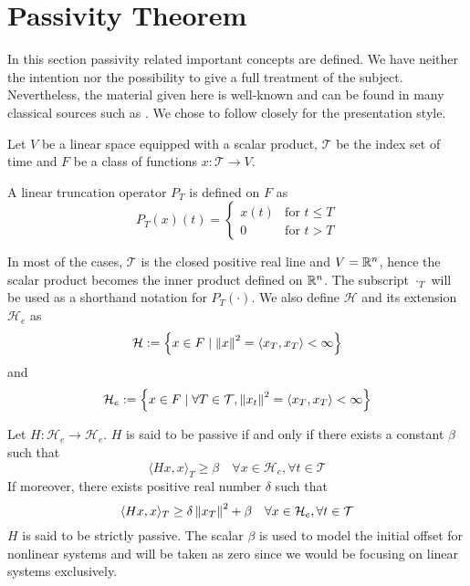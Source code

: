 \section{Passivity Theorem}
In this section passivity related important concepts are defined. We have neither the intention nor the possibility to give a full 
treatment of the subject. Nevertheless, the material given here is well-known and can be found in many classical sources such as
\cite{hillmoylan77,desvid,vdschaftbook}. We chose to follow closely \cite{desvid} for the presentation style. 

Let $V$ be a linear space equipped with a scalar product, $\mathcal{T}$ be the index set of time and $F$ be a class of functions 
$x:\mathcal{T}\to V$.
\begin{define} A linear truncation operator $P_T$ is defined on $F$ as 
\begin{equation}
P_T(x)(t) = \begin{cases} x(t) &\text{for } t\leq T\\ 0 &\text{for } t>T\end{cases}
\label{eq:apdx:trunc}
\end{equation}
\end{define}

In most of the cases, $\mathcal{T}$ is the closed positive real line and $V=\mathbb{R}^n$, hence the scalar product becomes the inner product 
defined on $\mathbb{R}^n$. The subscript ${\cdot}_T$ will be used as a shorthand notation for $P_T(\cdot)$. We also define $\mathcal{H}$ 
and its extension $\mathcal{H}_e$ as 
\[
\mathcal{H} := \left\{ x\in F\mid \displaystyle \left\| x \right\|^2=\langle x_T,x_T \rangle<\infty \right\}
\]
and
\[
\mathcal{H}_e := \left\{ x\in F\mid \forall T\in\mathcal{T}, \displaystyle \left\| x_t \right\|^2=\langle x_T,x_T \rangle<\infty \right\}
\]



\begin{define}Let $H:\mathcal{H}_e\to\mathcal{H}_e$. $H$ is said to be passive if and only if there exists a constant 
$\beta$ such that
\[
\langle Hx,x \rangle_T \geq \beta\quad \forall x\in\mathcal{H}_e,\forall t\in\mathcal{T}
\]
If moreover, there exists positive real number $\delta$ such that
\[
\langle Hx,x \rangle_T \geq \delta\displaystyle \left\| x_T \right\|^2+ \beta\quad \forall x\in\mathcal{H}_e,\forall t\in\mathcal{T}
\]
$H$ is said to be strictly passive. The scalar $\beta$ is used to model the initial offset for nonlinear systems and 
will be taken as zero since we would be focusing on linear systems exclusively. 
\end{define}


